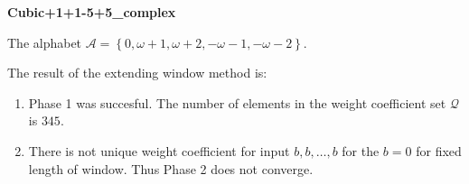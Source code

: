 \begin{exmp}
\textbf{ Cubic+1+1-5+5\_complex }

\label{ex:Cubic+1+1-5+5complex}

The alphabet $\mathcal{A} =\left\{0, \omega + 1, \omega + 2, -\omega - 1, -\omega - 2\right\}$.

The result of the extending window method is:
\begin{enumerate}
    \item Phase 1 was succesful.
The number of elements in the weight coefficient set $\mathcal{Q}$ is $345$.

    \item There is not unique weight coefficient for input $b,b,\dots,b$ for the $b= 0 $ for fixed length of window. Thus Phase 2 does not converge.

\end{enumerate}
\end{exmp}
